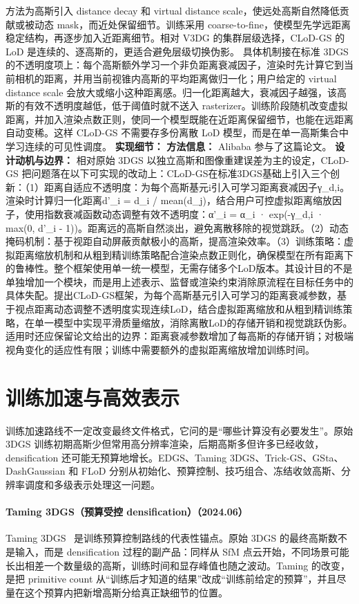 方法为高斯引入 distance decay 和 virtual distance scale，使远处高斯自然降低贡献或被动态 mask，而近处保留细节。训练采用 coarse-to-fine，使模型先学远距离稳定结构，再逐步加入近距离细节。相对 V3DG 的集群层级选择，CLoD-GS 的 LoD 是连续的、逐高斯的，更适合避免层级切换伪影。
具体机制接在标准 3DGS 的不透明度项上：每个高斯额外学习一个非负距离衰减因子，渲染时先计算它到当前相机的距离，并用当前视锥内高斯的平均距离做归一化；用户给定的 virtual distance scale 会放大或缩小这种距离感。归一化距离越大，衰减因子越强，该高斯的有效不透明度越低，低于阈值时就不送入 rasterizer。训练阶段随机改变虚拟距离，并加入渲染点数正则，使同一个模型既能在近距离保留细节，也能在远距离自动变稀。这样 CLoD-GS 不需要存多份离散 LoD 模型，而是在单一高斯集合中学习连续的可见性调度。
\textbf{实现细节：}
\textbf{方法信息：} Alibaba 参与了这篇论文。
\textbf{设计动机与边界：} 相对原始 3DGS 以独立高斯和图像重建误差为主的设定，CLoD-GS 把问题落在以下可实现的改动上：CLoD-GS在标准3DGS基础上引入三个创新：（1）距离自适应不透明度：为每个高斯基元i引入可学习距离衰减因子γ\_{d,i}。渲染时计算归一化距离d'\_i = d\_i / mean(d\_j)，结合用户可控虚拟距离缩放因子，使用指数衰减函数动态调整有效不透明度：α'\_i = α\_i · exp(-γ\_{d,i} · max(0, d'\_i - 1))。距离远的高斯自然淡出，避免离散移除的视觉跳跃。（2）动态掩码机制：基于视距自动屏蔽贡献极小的高斯，提高渲染效率。（3）训练策略：虚拟距离缩放机制和从粗到精训练策略配合渲染点数正则化，确保模型在所有距离下的鲁棒性。整个框架使用单一统一模型，无需存储多个LoD版本。其设计目的不是单独增加一个模块，而是用上述表示、监督或渲染约束消除原流程在目标任务中的具体失配。提出CLoD-GS框架，为每个高斯基元引入可学习的距离衰减参数，基于视点距离动态调整不透明度实现连续LoD，结合虚拟距离缩放和从粗到精训练策略，在单一模型中实现平滑质量缩放，消除离散LoD的存储开销和视觉跳跃伪影。适用时还应保留论文给出的边界：距离衰减参数增加了每高斯的存储开销；对极端视角变化的适应性有限；训练中需要额外的虚拟距离缩放增加训练时间。

\section{训练加速与高效表示}

训练加速路线不一定改变最终文件格式，它问的是“哪些计算没有必要发生”。原始 3DGS 训练初期高斯少但常用高分辨率渲染，后期高斯多但许多已经收敛，densification 还可能无预算地增长。EDGS、Taming 3DGS、Trick-GS、GSta、DashGaussian 和 FLoD 分别从初始化、预算控制、技巧组合、冻结收敛高斯、分辨率调度和多级表示处理这一问题。
\paragraph{Taming 3DGS（预算受控 densification）（2024.06）}
Taming 3DGS~\cite{2406_15643} 是训练预算控制路线的代表性锚点。原始 3DGS 的最终高斯数不是输入，而是 densification 过程的副产品：同样从 SfM 点云开始，不同场景可能长出相差一个数量级的高斯，训练时间和显存峰值也随之波动。Taming 的改变，是把 primitive count 从“训练后才知道的结果”改成“训练前给定的预算”，并且尽量在这个预算内把新增高斯分给真正缺细节的位置。

